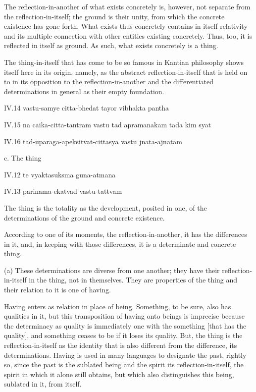 The reflection-in-another of what exists concretely is,
however, not separate from the reflection-in-itself;
the ground is their unity, from which the concrete existence has gone forth.
What exists thus concretely contains in itself relativity and
its multiple connection with other entities existing concretely.
Thus, too, it is reflected in itself as ground.
As such, what exists concretely is a thing.

The thing-in-itself that has come to be so famous in
Kantian philosophy shows itself here in its origin, namely,
as the abstract reflection-in-itself that is held on to
in its opposition to the reflection-in-another and
the differentiated determinations in general
as their empty foundation.

IV.14
vastu-samye citta-bhedat tayor vibhakta pantha

IV.15
na caika-citta-tantram vastu tad apramanakam tada kim syat

IV.16
tad-uparaga-apeksitvat-cittasya vastu jnata-ajnatam

c. The thing

IV.12
te vyaktasuksma guna-atmana

IV.13
parinama-ekatvad vastu-tattvam

The thing is the totality as the development, posited in one,
of the determinations of the ground and concrete existence.

According to one of its moments, the reflection-in-another,
it has the differences in it, and, in keeping with those differences,
it is a determinate and concrete thing.

(a) These determinations are diverse from one another;
they have their reflection-in-itself in the thing, not in themselves.
They are properties of the thing and their relation to it is one of having.

    Having enters as relation in place of being.
    Something, to be sure, also has qualities in it,
    but this transposition of having onto
    beings is imprecise because the determinacy as quality
    is immediately one with the something [that has the quality], and
    something ceases to be if it loses its quality.
    But, the thing is the reflection-in-itself as
    the identity that is also different from
    the difference, its determinations.
    Having is used in many languages to designate the past,
    rightly so, since the past is the sublated being and
    the spirit its reflection-in-itself,
    the spirit in which it alone still obtains,
    but which also distinguishes this being,
    sublated in it, from itself.

